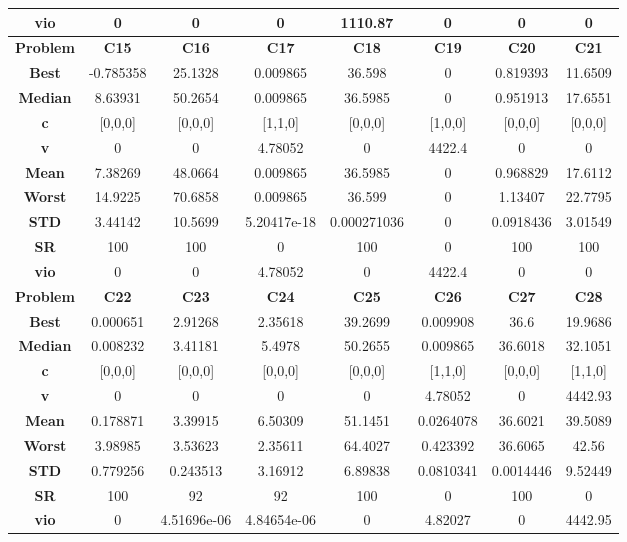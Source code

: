 \documentclass{IEEEtran}
\begin{document}
\begin{center}
\begin{tabular}{|c|c|c|c|c|c|c|c|}
    \textbf{vio} & 0 & 0 & 0 & 1110.87 & 0 & 0 & 0\\ 
    \hline 
    \hline 
    \textbf{Problem} & \textbf{C15} & \textbf{C16} & \textbf{C17} & \textbf{C18} & \textbf{C19} & \textbf{C20} & \textbf{C21} \\ 
    \hline\hline 
    \textbf{Best} & -0.785358 & 25.1328 & 0.009865 & 36.598 & 0 & 0.819393 & 11.6509\\ 
    \textbf{Median} & 8.63931 & 50.2654 & 0.009865 & 36.5985 & 0 & 0.951913 & 17.6551\\ 
    \textbf{c} & [0,0,0] & [0,0,0] & [1,1,0] & [0,0,0] & [1,0,0] & [0,0,0] & [0,0,0]\\ 
    \textbf{v} & 0 & 0 & 4.78052 & 0 & 4422.4 & 0 & 0\\ 
    \textbf{Mean} & 7.38269 & 48.0664 & 0.009865 & 36.5985 & 0 & 0.968829 & 17.6112\\ 
    \textbf{Worst} & 14.9225 & 70.6858 & 0.009865 & 36.599 & 0 & 1.13407 & 22.7795\\ 
    \textbf{STD} & 3.44142 & 10.5699 & 5.20417e-18 & 0.000271036 & 0 & 0.0918436 & 3.01549\\ 
    \textbf{SR} & 100 & 100 & 0 & 100 & 0 & 100 & 100\\ 
    \textbf{vio} & 0 & 0 & 4.78052 & 0 & 4422.4 & 0 & 0\\ 
    \hline 
    \hline 
    \textbf{Problem} & \textbf{C22} & \textbf{C23} & \textbf{C24} & \textbf{C25} & \textbf{C26} & \textbf{C27} & \textbf{C28} \\ 
    \hline\hline 
    \textbf{Best} & 0.000651 & 2.91268 & 2.35618 & 39.2699 & 0.009908 & 36.6 & 19.9686\\ 
    \textbf{Median} & 0.008232 & 3.41181 & 5.4978 & 50.2655 & 0.009865 & 36.6018 & 32.1051\\ 
    \textbf{c} & [0,0,0] & [0,0,0] & [0,0,0] & [0,0,0] & [1,1,0] & [0,0,0] & [1,1,0]\\ 
    \textbf{v} & 0 & 0 & 0 & 0 & 4.78052 & 0 & 4442.93\\ 
    \textbf{Mean} & 0.178871 & 3.39915 & 6.50309 & 51.1451 & 0.0264078 & 36.6021 & 39.5089\\ 
    \textbf{Worst} & 3.98985 & 3.53623 & 2.35611 & 64.4027 & 0.423392 & 36.6065 & 42.56\\ 
    \textbf{STD} & 0.779256 & 0.243513 & 3.16912 & 6.89838 & 0.0810341 & 0.0014446 & 9.52449\\ 
    \textbf{SR} & 100 & 92 & 92 & 100 & 0 & 100 & 0\\ 
    \textbf{vio} & 0 & 4.51696e-06 & 4.84654e-06 & 0 & 4.82027 & 0 & 4442.95\\ 
    \hline 
  \end{tabular}
\end{center}
\newpage
\end{document}
